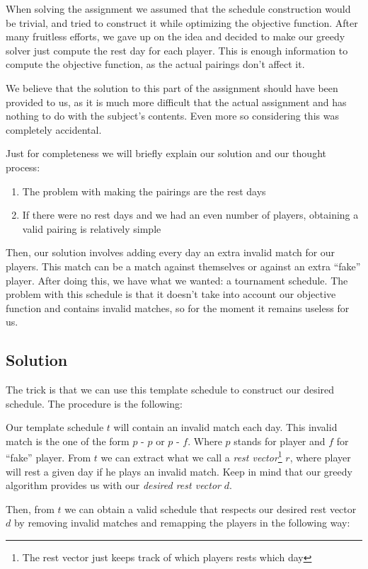 \documentclass[a4paper, 10pt]{article}
\begin{document}
When solving the assignment we assumed that the schedule construction would be trivial, and tried to construct it while optimizing the objective function. After many fruitless efforts, we gave up on the idea and decided to make our greedy solver just compute the rest day for each player. This is enough information to compute the objective function, as the actual pairings don't affect it.

We believe that the solution to this part of the assignment should have been provided to us, as it is much more difficult that the actual assignment and has nothing to do with the subject's contents. Even more so considering this was completely accidental.


Just for completeness we will briefly explain our solution and our thought process:

\begin{enumerate}
    \item The problem with making the pairings are the rest days
    \item If there were no rest days and we had an even number of players, obtaining a valid pairing is relatively simple
\end{enumerate}

Then, our solution involves adding every day an extra invalid match for our players. This match can be a match against themselves or against an extra ``fake'' player. After doing this, we have what we wanted: a tournament schedule. The problem with this schedule is that it doesn't take into account our objective function and contains invalid matches, so for the moment it remains useless for us.


\subsection{Solution}
The trick is that we can use this template schedule to construct our desired schedule. The procedure is the following:

Our template schedule $t$ will contain an invalid match each day. This invalid match is the one of the form $p$ - $p$ or $p$ - $f$. Where $p$ stands for player and $f$ for ``fake'' player. From $t$ we can extract what we call a \textit{rest vector}\footnote{The rest vector just keeps track of which players rests which day} $r$, where player will rest a given day if he plays an invalid match. Keep in mind that our greedy algorithm provides us with our \textit{desired rest vector} $d$.

Then, from $t$ we can obtain a valid schedule that respects our desired rest vector $d$ by removing invalid matches and remapping the players in the following way:
\end{document}
